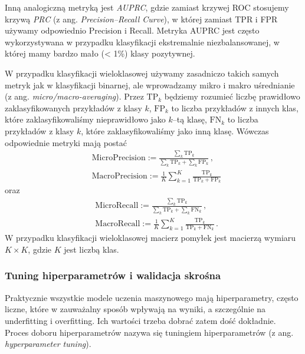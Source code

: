 \documentclass{myclass}
\numberwithin{equation}{subsection}
\begin{document}
Inną analogiczną metryką jest \emph{AUPRC}, gdzie zamiast krzywej ROC stosujemy krzywą \emph{PRC} (z
ang. \textit{Precision--Recall Curve}), w której zamiast TPR i FPR używamy odpowiednio Precision i
Recall. Metryka AUPRC jest często wykorzystywana w przypadku klasyfikacji ekstremalnie
niezbalansowanej, w której mamy bardzo mało (< 1\%) klasy pozytywnej.

W przypadku klasyfikacji wieloklasowej używamy zasadniczo takich samych metryk jak w klasyfikacji
binarnej, ale wprowadzamy mikro i makro uśrednianie (z ang. \textit{micro/macro-averaging}). Przez
\(\mathrm{TP}_k\) będziemy rozumieć liczbę prawidłowo zaklasyfikowanych przykładów z klasy \(k\),
\(\mathrm{FP}_k\) to liczba przykładów z innych klas, które zaklasyfikowaliśmy nieprawidłowo jako
\(k\)--tą klasę, \(\mathrm{FN}_k\) to liczba przykładów z klasy \(k\), które zaklasyfikowaliśmy jako
inną klasę. Wówczas odpowiednie metryki mają postać
\[
\begin{split}
&\mathrm{MicroPrecision} := \frac{\sum_{k} \mathrm{TP}_k}{\sum_{k} \mathrm{TP}_k + \sum_{k} \mathrm{FP}_k}\,,\\
&\mathrm{MacroPrecision} := \frac{1}{K} \sum_{k=1}^K \frac{\mathrm{TP}_k}{\mathrm{TP}_k + \mathrm{FP}_k}
\end{split}
\]
oraz
\[
\begin{split}
&\mathrm{MicroRecall} := \frac{\sum_{k} \mathrm{TP}_k}{\sum_{k} \mathrm{TP}_k + \sum_{k} \mathrm{FN}_k}\,,\\
&\mathrm{MacroRecall} := \frac{1}{K} \sum_{k=1}^K \frac{\mathrm{TP}_k}{\mathrm{TP}_k + \mathrm{FN}_k}\,.
\end{split}
\]
W przypadku klasyfikacji wieloklasowej macierz pomyłek jest macierzą wymiaru \(K \times K\), gdzie
\(K\) jest liczbą klas.


\subsubsection{Tuning hiperparametrów i walidacja skrośna}

Praktycznie wszystkie modele uczenia maszynowego mają hiperparametry, często liczne, które w
zauważalny sposób wpływają na wyniki, a szczególnie na underfitting i overfitting. Ich wartości
trzeba dobrać zatem dość dokładnie. Proces doboru hiperparametrów nazywa się tuningiem
hiperparametrów (z ang. \textit{hyperparameter tuning}).
\end{document}
